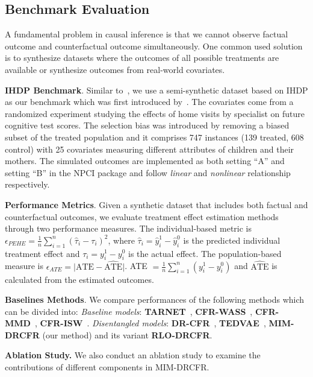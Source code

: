\documentclass[sigconf]{acmart}
\begin{document}
\subsection{Benchmark Evaluation}
A fundamental problem in causal inference is that we cannot observe factual outcome and counterfactual outcome simultaneously. One common used solution is to synthesize datasets where the outcomes of all possible treatments are available or synthesize outcomes from real-world covariates.\par
\textbf{IHDP Benchmark}. Similar to~\citep{Shalit2017EstimatingIT,Hassanpour2019CounterFactualRW,Zhang2021TreatmentEE}, we use a semi-synthetic dataset based on IHDP as our benchmark which was first introduced by~\citep{Hill2011BayesianNM}. The covariates come from a randomized experiment studying the effects of home visits by specialist on future cognitive test scores. The selection bias was introduced by removing a biased subset of the treated population and it comprises 747 instances (139 treated, 608 control) with 25 covariates measuring different attributes of children and their mothers. The simulated outcomes are implemented as both setting “A” and setting “B” in the NPCI package and follow \textit{linear} and \textit{nonlinear} relationship respectively.\par

\textbf{Performance Metrics}. Given a synthetic dataset that includes both factual and counterfactual outcomes, we evaluate treatment effect estimation methods through two performance measures. The individual-based metric is $\epsilon_{\textit{PEHE}}=\frac{1}{n}\sum_{i=1}^{n}{(\hat{\tau}_{i}-\tau_{i})^{2}}$, where $\hat{\tau}_{i}=\hat{y}_{i}^{1}-\hat{y}_{i}^{0}$ is the predicted individual treatment effect and $\tau_{i}=y_{i}^{1}-y_{i}^{0}$ is the actual effect.
The population-based measure is $\epsilon_{\textit{ATE}}=\vert \mathrm{ATE}-\widehat{\mathrm{ATE}}\vert$. ATE $=\frac{1}{n}\sum_{i=1}^{n}(y_{i}^{1}-y_{i}^{0})$ and $\widehat{\mathrm{ATE}}$ is calculated from the estimated outcomes.\par 

\textbf{Baselines Methods}. We compare performances of the following methods which can be divided into: \textit{Baseline models}: \textbf{TARNET}~\citep{Shalit2017EstimatingIT}, \textbf{CFR-WASS}~\citep{Shalit2017EstimatingIT}, \textbf{CFR-MMD}~\citep{Shalit2017EstimatingIT}, \textbf{CFR-ISW}~\citep{Hassanpour2019CounterFactualRW}. 
\textit{Disentangled models}: \textbf{DR-CFR}~\citep{Hassanpour2020LearningDR}, \textbf{TEDVAE}~\citep{Zhang2021TreatmentEE}, \textbf{MIM-DRCFR} (our method) and its variant \textbf{RLO-DRCFR}.\par
\textbf{Ablation Study.} We also conduct an ablation study to examine the contributions of different components in MIM-DRCFR.\par
\end{document}
